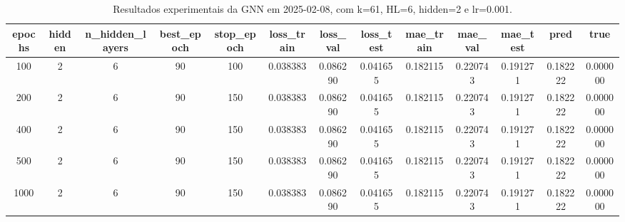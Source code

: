\begin{table}[h]
\centering
\caption{Resultados experimentais da GNN em 2025-02-08, com k=61, HL=6, hidden=2 e lr=0.001.}
\label{tab:gnn_results_k61_hl6_h2_d20250208}
\begin{tabular}{ccccccccccccc}
\toprule
epochs & hidden & n\_hidden\_layers & best\_epoch & stop\_epoch & loss\_train & loss\_val & loss\_test & mae\_train & mae\_val & mae\_test & pred & true \\
\midrule
100 & 2 & 6 & 90 & 100 & 0.038383 & 0.086290 & 0.041655 & 0.182115 & 0.220743 & 0.191271 & 0.182222 & 0.000000 \\
200 & 2 & 6 & 90 & 150 & 0.038383 & 0.086290 & 0.041655 & 0.182115 & 0.220743 & 0.191271 & 0.182222 & 0.000000 \\
400 & 2 & 6 & 90 & 150 & 0.038383 & 0.086290 & 0.041655 & 0.182115 & 0.220743 & 0.191271 & 0.182222 & 0.000000 \\
500 & 2 & 6 & 90 & 150 & 0.038383 & 0.086290 & 0.041655 & 0.182115 & 0.220743 & 0.191271 & 0.182222 & 0.000000 \\
1000 & 2 & 6 & 90 & 150 & 0.038383 & 0.086290 & 0.041655 & 0.182115 & 0.220743 & 0.191271 & 0.182222 & 0.000000 \\
\bottomrule
\end{tabular}
\end{table}
